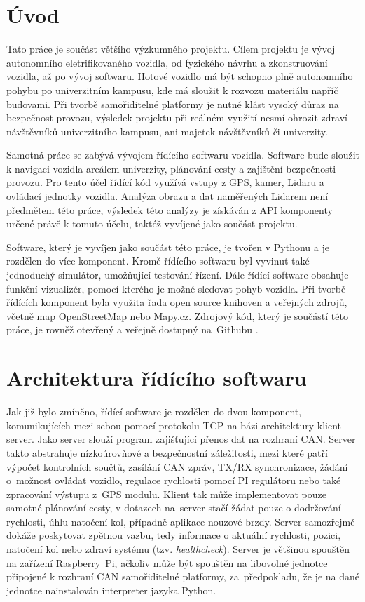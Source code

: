 \documentclass[czech, bachelor]{diploma}
\begin{document}
\MakeTitlePages

\chapter{Úvod} \label{sec:Introduction}
Tato práce je součást většího výzkumného projektu. Cílem projektu je vývoj autonomního eletrifikovaného vozidla,
od fyzického návrhu a zkonstruování vozidla, až po vývoj softwaru. Hotové vozidlo má být schopno plně autonomního pohybu
po univerzitním kampusu, kde má sloužit k rozvozu materiálu napříč budovami. Při tvorbě samořiditelné platformy je nutné
klást vysoký důraz na bezpečnost provozu, výsledek projektu při reálném využití nesmí ohrozit zdraví návštěvníků univerzitního
kampusu, ani majetek návštěvníků či univerzity.

Samotná práce se zabývá vývojem řídícího softwaru vozidla. Software bude sloužit k navigaci vozidla areálem univerzity,
plánování cesty a zajištění bezpečnosti provozu. Pro tento účel řídící kód využívá vstupy z GPS, kamer, Lidaru
a ovládací jednotky vozidla. Analýza obrazu a dat naměřených Lidarem není předmětem této práce, výsledek této analýzy
je získáván z API komponenty určené právě k tomuto účelu, taktéž vyvíjené jako součást projektu.

Software, který je vyvíjen jako součást této práce, je tvořen v Pythonu a je rozdělen do více komponent. Kromě řídícího softwaru
byl vyvinut také jednoduchý simulátor, umožňující testování řízení. Dále řídící software obsahuje funkční vizualizér, pomocí
kterého je možné sledovat pohyb vozidla. Při tvorbě řídících komponent byla využita řada open source knihoven a veřejných zdrojů,
včetně map OpenStreetMap nebo Mapy.cz. Zdrojový kód, který je součástí této práce, je rovněž otevřený a veřejně dostupný
na~Githubu \cite{car-client-source, car-webapp-source, car-map-downloader-source, car-can-source, car-simulator-source,
geologger-source}.

\chapter{Architektura řídícího softwaru} \label{software-architecture}
Jak již bylo zmíněno, řídící software je rozdělen do dvou komponent, komunikujících mezi sebou pomocí protokolu TCP na bázi
architektury klient-server. Jako server slouží program zajišťující přenos dat na rozhraní CAN. Server takto abstrahuje
nízkoúrovňové a bezpečnostní záležitosti, mezi které patří výpočet kontrolních součtů, zasílání CAN zpráv, TX/RX synchronizace,
žádání o~možnost ovládat vozidlo, regulace rychlosti pomocí PI regulátoru nebo také zpracování výstupu z~GPS modulu. Klient tak
může implementovat pouze samotné plánování cesty, v dotazech na~server stačí žádat pouze o dodržování rychlosti, úhlu natočení
kol, případně aplikace nouzové brzdy. Server samozřejmě dokáže poskytovat zpětnou vazbu, tedy informace o aktuální rychlosti,
pozici, natočení kol nebo zdraví systému (tzv. \emph{healthcheck}). Server je většinou spouštěn na zařízení Raspberry~Pi, ačkoliv
může být spouštěn na libovolné jednotce připojené k rozhraní CAN samořiditelné platformy, za~předpokladu, že je na dané jednotce
nainstalován interpreter jazyka Python.
\end{document}
